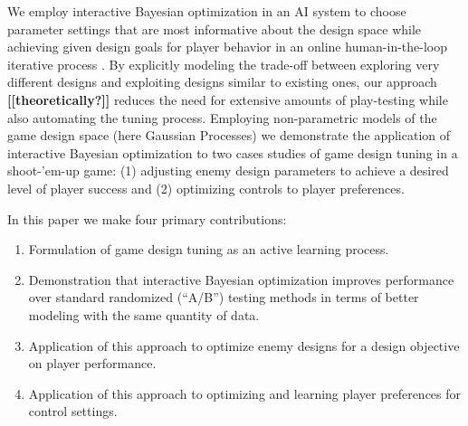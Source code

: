 \documentclass{sig-alternate}
\newcommand{\mytodo}[1]{\textbf{[[#1]]}}
\begin{document}


We employ interactive Bayesian optimization in an AI system to choose parameter settings that are most informative about the design space while achieving given design goals for player behavior in an online human-in-the-loop iterative process \cite{brochu2010:thesis}. By explicitly modeling the trade-off between exploring very different designs and exploiting designs similar to existing ones, our approach \mytodo{theoretically?} reduces the need for extensive amounts of play-testing while also automating the tuning process.
Employing non-parametric models of the game design space (here Gaussian Processes) we demonstrate the application of interactive Bayesian optimization to two cases studies of game design tuning in a shoot-'em-up game: (1) adjusting enemy design parameters to achieve a desired level of player success and (2) optimizing controls to player preferences.

In this paper we make four primary contributions:
\begin{enumerate}
\item Formulation of game design tuning as an active learning process.
\item Demonstration that interactive Bayesian optimization improves performance 
over standard randomized (``A/B'') testing methods in terms of better modeling with the same quantity of data.
\item Application of this approach to optimize enemy designs for a design objective on player performance.
\item Application of this approach to optimizing and learning player preferences for control settings.
\end{enumerate}
\end{document}
